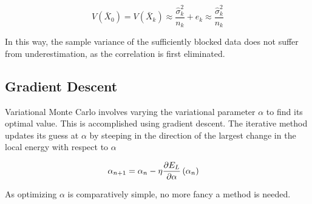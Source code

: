 \begin{equation}\label{eq:trunc}
V(\bar{X}_0) = V(\bar{X}_k) \approx \frac{\hat{\sigma}_k^2}{n_k} +  e_k \approx \frac{\hat{\sigma}_k^2}{n_k}
\end{equation}

In this way, the sample variance of the sufficiently blocked data does not suffer from underestimation, as the correlation is first eliminated. 
  

\subsection{Gradient Descent}
Variational Monte Carlo involves varying the variational parameter \(\alpha\)
to find its optimal value. This is accomplished using gradient descent. The
iterative method updates its guess at \(\alpha\) by steeping in the direction of
the largest change in the local energy with respect to \(\alpha\)

\begin{align*}
  \alpha_{n+1} &= \alpha_{n} - \eta\pdv{E_{L}}{\alpha}\left( \alpha_{n} \right)
\end{align*}

As optimizing \(\alpha\) is comparatively simple, no more fancy a method is
needed.

